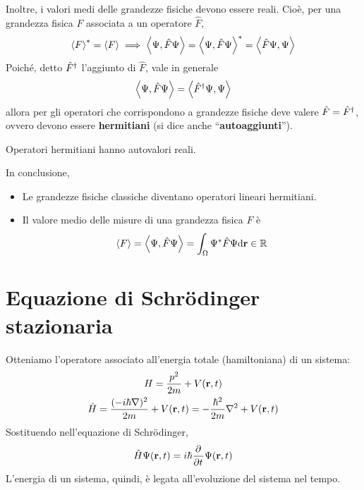 Inoltre, i valori medi delle grandezze fisiche devono essere reali.
Cioè, per una grandezza fisica $F$ associata a un operatore $\hat{F}$,
\begin{gather}
    \left\langle F \right\rangle^* = \left\langle F \right\rangle
    \implies
    \left\langle \Psi, \hat{F} \Psi \right\rangle = \left\langle \Psi, \hat{F} \Psi \right\rangle^* = \left\langle \hat{F} \Psi, \Psi \right\rangle
\end{gather}
Poiché, detto $\hat{F}^\dagger$ l'aggiunto di $\hat{F}$, vale in generale
\begin{equation}
    \left\langle \Psi, \hat{F} \Psi \right\rangle = \left\langle \hat{F}^\dagger \Psi, \Psi \right\rangle
\end{equation}
allora per gli operatori che corrispondono a grandezze fisiche deve valere $\hat{F} = \hat{F}^\dagger$, ovvero devono essere \textbf{hermitiani} (si dice anche ``\textbf{autoaggiunti}'').

Operatori hermitiani hanno autovalori reali.

In conclusione,
\begin{itemize}
    \item Le grandezze fisiche classiche diventano operatori lineari hermitiani.
    \item Il valore medio delle misure di una grandezza fisica $F$ è
        \begin{equation}
            \left\langle F \right\rangle = \left\langle \Psi, \hat{F} \Psi \right\rangle
            = \int_\Omega \Psi^* \hat{F} \Psi \mathrm{d}\mathbf{r}
            \in \mathbb{R}
        \end{equation}
\end{itemize}


\section{Equazione di Schrödinger stazionaria}

Otteniamo l'operatore associato all'energia totale (hamiltoniana) di un sistema:
\begin{gather}
    H = \frac{p^2}{2 m} + V(\mathbf{r}, t) \\
    \hat{H} = \frac{(-i \hbar \nabla)^2}{2 m} + V(\mathbf{r}, t)
    = -\frac{\hbar^2}{2 m} \nabla^2 + V(\mathbf{r}, t)
\end{gather}
Sostituendo nell'equazione di Schrödinger,
\begin{equation}
\label{eq:schr_hamiltoniana}
    \hat{H} \Psi(\p, t) = \im \hbar \parder{t} \Psi(\p, t)
\end{equation}
L'energia di un sistema, quindi, è legata all'evoluzione del sistema nel tempo.

